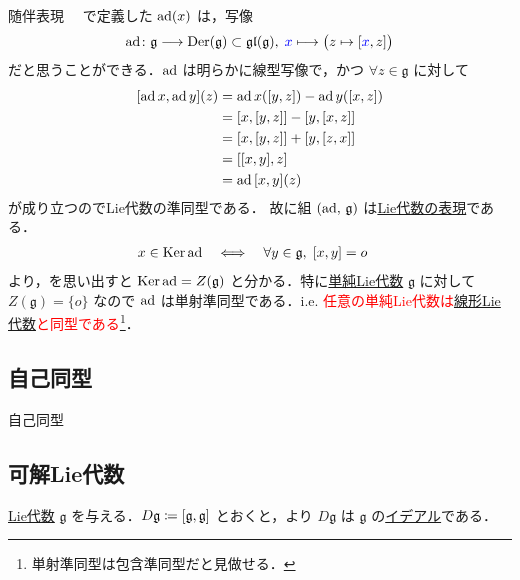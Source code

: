 \documentclass[rep_main]{subfiles}
\begin{document}
\begin{myexample}[label=def:adj-LieAlg]{随伴表現}
    　で定義した $\operatorname{ad} (x)$ は，写像
    \begin{align}
        \ad \colon \mathfrak{g} \lto \Der(\mathfrak{g}) \subset \Lgl (\mathfrak{g}),\; \textcolor{blue}{x} \lmto \bigl( z \mapsto \comm{\textcolor{blue}{x}}{z} \bigr) 
    \end{align}
    だと思うことができる．$\operatorname{ad}$ は明らかに線型写像で，かつ $\forall z \in \mathfrak{g}$ に対して
    \begin{align}
        \comm{\ad x}{\ad y}(z) &= \ad x (\comm{y}{z}) - \ad y (\comm{x}{z}) \\
        &= \comm{x}{\comm{y}{z}} - \comm{y}{\comm{x}{z}} \\
        &= \comm{x}{\comm{y}{z}} + \comm{y}{\comm{z}{x}} \\
        &= \comm{\comm{x}{y}}{z} \\
        &= \ad \comm{x}{y} (z)
    \end{align}
    が成り立つのでLie代数の準同型である．
    故に組 $(\operatorname{ad},\, \mathfrak{g})$ は\hyperref[def:rep-LieAlg]{Lie代数の表現}である．
    \begin{align}
        x \in \Ker \ad &\IFF \forall y \in \mathfrak{g},\; \comm{x}{y} = o
    \end{align}
    より，を思い出すと $\operatorname{Ker} \operatorname{ad} = Z(\mathfrak{g})$ と分かる．特に\hyperref[def:simple-LieAlg]{単純Lie代数} $\mathfrak{g}$ に対して $Z(\mathfrak{g}) = \{o\}$ なので $\operatorname{ad}$ は単射準同型である．i.e. \textcolor{red}{任意の単純Lie代数は\hyperref[def:linearLieAlg]{線形Lie代数}と同型である}\footnote{単射準同型は包含準同型だと見做せる．}．
\end{myexample}

\subsection{自己同型}

\begin{mydef}[label=def:auto-LieAlg]{自己同型}

\end{mydef}

\subsection{可解Lie代数}

\hyperref[ax:LieAlg]{Lie代数} $\mathfrak{g}$ を与える．$D \mathfrak{g} \coloneqq \comm{\mathfrak{g}}{\mathfrak{g}}$ とおくと，より $D \mathfrak{g}$ は $\mathfrak{g}$ の\hyperref[def:ideal-LieAlg]{イデアル}である．
\end{document}
